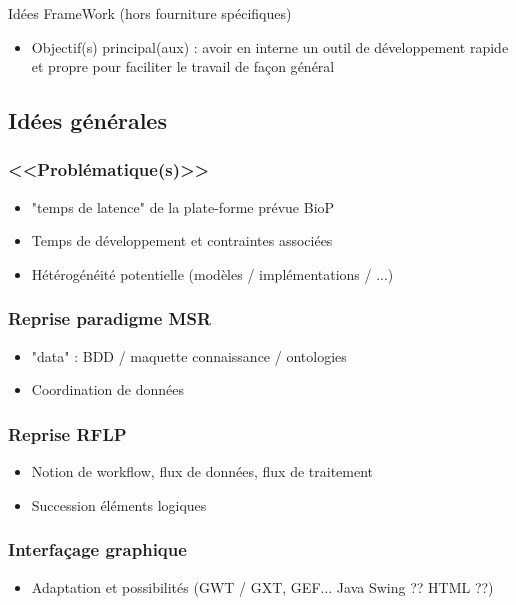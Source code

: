 \documentclass[11pt,twoside,a4paper]{article}
\begin{document}
Id{\'e}es FrameWork (hors fourniture spécifiques)
	\begin{itemize}
		\item Objectif(s) principal(aux) : avoir en interne un outil de d{\'e}veloppement rapide et propre pour faciliter le travail de fa\c{c}on g{\'e}n{\'e}ral
	\end{itemize}
	
\subsection{Id{\'e}es g{\'e}n{\'e}rales}

\subsubsection{<<Probl{\'e}matique(s)>>}
	\begin{itemize}
		\item "temps de latence" de la plate-forme pr{\'e}vue BioP
		\item Temps de d{\'e}veloppement et contraintes associ{\'e}es
		\item H{\'e}t{\'e}rog{\'e}n{\'e}it{\'e} potentielle (mod{\`e}les / impl{\'e}mentations / ...)
	\end{itemize}

\subsubsection{Reprise paradigme MSR}
	\begin{itemize}
		\item "data" : BDD / maquette connaissance / ontologies
		\item Coordination de donn{\'e}es
	\end{itemize}

\subsubsection{Reprise RFLP}
	\begin{itemize}
		\item Notion de workflow, flux de donn{\'e}es, flux de traitement
		\item Succession {\'e}l{\'e}ments logiques
	\end{itemize}

\subsubsection{Interfa\c{c}age graphique}
	\begin{itemize}
		\item Adaptation et possibilit{\'e}s (GWT / GXT, GEF... Java Swing ?? HTML ??)
	\end{itemize}
\end{document}
